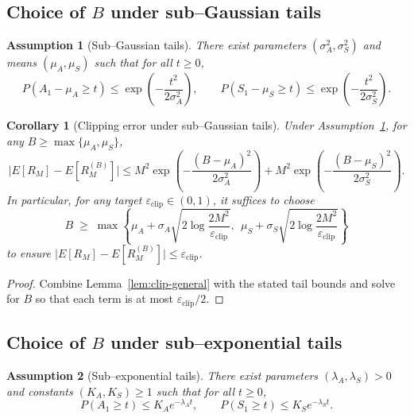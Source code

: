 \documentclass[11pt]{article}
\newtheorem{assumption}{Assumption}
\newtheorem{corollary}{Corollary}
\begin{document}
\subsection{Choice of $B$ under sub--Gaussian tails}

\begin{assumption}[Sub--Gaussian tails]
\label{ass:subgaussian}
There exist parameters $(\sigma_A^2,\sigma_S^2)$ and means
$(\mu_A,\mu_S)$ such that for all $t\ge 0$,
\[
P(A_1-\mu_A \ge t) \le \exp\!\left(-\frac{t^2}{2\sigma_A^2}\right),
\qquad
P(S_1-\mu_S \ge t) \le \exp\!\left(-\frac{t^2}{2\sigma_S^2}\right).
\]
\end{assumption}

\begin{corollary}[Clipping error under sub--Gaussian tails]
\label{cor:clip-subgaussian}
Under Assumption~\ref{ass:subgaussian}, for any $B\ge \max\{\mu_A,\mu_S\}$,
\[
\bigl|E[R_M]-E[R_M^{(B)}]\bigr|
\le
M^2 \exp\!\left(-\frac{(B-\mu_A)^2}{2\sigma_A^2}\right)
+
M^2 \exp\!\left(-\frac{(B-\mu_S)^2}{2\sigma_S^2}\right).
\]
In particular, for any target $\varepsilon_{\mathrm{clip}}\in(0,1)$, it suffices to choose
\begin{equation}
\label{eq:B-choice-subg}
B \;\ge\;
\max\!\left\{
\mu_A + \sigma_A\sqrt{2\log\frac{2M^2}{\varepsilon_{\mathrm{clip}}}},
\ \ 
\mu_S + \sigma_S\sqrt{2\log\frac{2M^2}{\varepsilon_{\mathrm{clip}}}}
\right\}
\end{equation}
to ensure $\bigl|E[R_M]-E[R_M^{(B)}]\bigr|\le \varepsilon_{\mathrm{clip}}$.
\end{corollary}

\begin{proof}
Combine Lemma~\ref{lem:clip-general} with the stated tail bounds and solve for
$B$ so that each term is at most $\varepsilon_{\mathrm{clip}}/2$.
\end{proof}

\subsection{Choice of $B$ under sub--exponential tails}

\begin{assumption}[Sub--exponential tails]
\label{ass:subexp}
There exist parameters $(\lambda_A,\lambda_S)>0$ and constants $(K_A,K_S)\ge 1$
such that for all $t\ge 0$,
\[
P(A_1 \ge t) \le K_A e^{-\lambda_A t},
\qquad
P(S_1 \ge t) \le K_S e^{-\lambda_S t}.
\]
\end{assumption}
\end{document}
